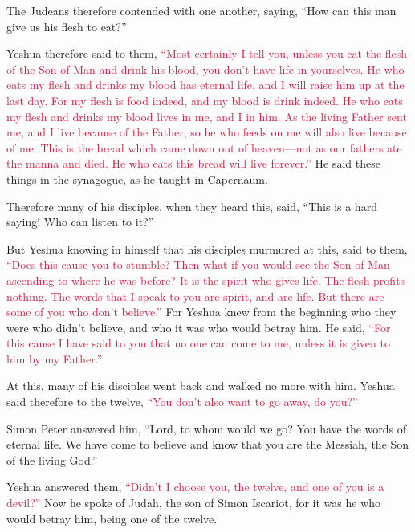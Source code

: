 \myverse{}The Judeans therefore contended with one another, saying, “How
can this man give us his flesh to eat?”

\myverse{}Yeshua therefore said to them,
\textcolor{crimson}{“Most certainly I tell you, unless you eat the flesh of the Son of Man and drink his blood, you don’t
	have life in yourselves.
}
\myverse{}\textcolor{crimson}{He who eats my flesh and drinks my blood has eternal life, and I will
	raise him up at the last day.
}
\myverse{}\textcolor{crimson}{For my flesh is food indeed, and my blood is drink indeed.
}
\myverse{}\textcolor{crimson}{He who eats my flesh and drinks my blood lives in me, and I in him.
}
\myverse{}\textcolor{crimson}{As the living Father sent me, and I live because of the Father, so he
	who feeds on me will also live because of me.
}
\myverse{}\textcolor{crimson}{This is the bread which came down out of heaven—not as our fathers ate
	the manna and died. He who eats this bread will live forever.”}
\myverse{}He said these things in the synagogue, as he taught in Capernaum.

\myverse{}Therefore many of his disciples, when they heard this, said,
“This is a hard saying! Who can listen to it?”

\myverse{}But Yeshua knowing in himself that his disciples murmured at
this, said to them,
\textcolor{crimson}{“Does this cause you to stumble?
}
\myverse{}\textcolor{crimson}{Then what if you would see the Son of Man ascending to where he was before?
}
\myverse{}\textcolor{crimson}{It is the spirit who gives life. The flesh profits nothing. The words
	that I speak to you are spirit, and are life.
}
\myverse{}\textcolor{crimson}{But there are some of you who don’t believe.”} For Yeshua knew from
the beginning who they were who didn’t believe, and who it was who would betray him.
\myverse{}He said,
\textcolor{crimson}{“For this cause I have said to you that no one can come to me, unless it is given to him by my Father.”}

\myverse{}At this, many of his disciples went back and walked no more with
him.
\myverse{}Yeshua said therefore to the twelve,
\textcolor{crimson}{“You don’t also want to go away, do you?”}

\myverse{}Simon Peter answered him, “Lord, to whom would we go? You have
the words of eternal life.
\myverse{}We have come to believe and know that you are the Messiah, the Son of the
living God.”

\myverse{}Yeshua answered them,
\textcolor{crimson}{“Didn’t I choose you, the twelve, and one of you is a devil?”}
\myverse{}Now he spoke of Judah, the son of Simon Iscariot, for it was he who would
betray him, being one of the twelve.


